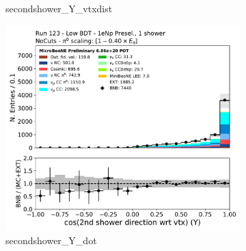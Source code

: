 \begin{figure}[H]
\begin{subfigure}{0.3\textwidth}
    \caption{secondshower\_Y\_vtxdist}
    \end{subfigure}
    \begin{subfigure}{0.3\textwidth}
    \includegraphics[width=1.0\textwidth]{Sidebands/Figures/1eNp/LPID_NPOneShr_None_pi0e40/secondshower_Y_dot.pdf}
    \caption{secondshower\_Y\_dot}
    \end{subfigure}
    \caption{} 
    \label{fig:LPID_1eNp_4}
\end{figure}

